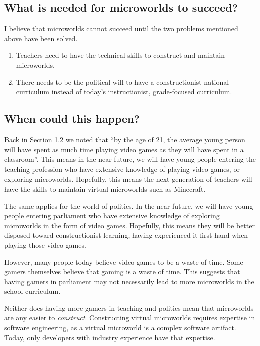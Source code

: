 \subsection{What is needed for microworlds to succeed?}

I believe that microworlds cannot succeed until the two problems
mentioned above have been solved.

\begin{enumerate}

\item
  Teachers need to have the technical skills to construct and maintain
  microworlds.

\item
  There needs to be the political will to have a constructionist
  national curriculum instead of today's instructionist, grade-focused curriculum.

\end{enumerate}

\subsection{When could this happen?}

Back in Section 1.2 we noted that ``by the age of 21, the average young
person will have spent as much time playing video games as they will
have spent in a classroom''. This means in the near future, we will have
young people entering the teaching profession who have extensive
knowledge of playing video games, or exploring microworlds. Hopefully,
this means the next generation of teachers will have the skills to
maintain virtual microworlds such as Minecraft.

The same applies for the world of politics. In the near future, we will
have young people entering parliament who have extensive knowledge of
exploring microworlds in the form of video games. Hopefully, this means
they will be better disposed toward constructionist learning, having
experienced it first-hand when playing those video games.

However, many people today believe video games to be a waste of
time\cite{debate}. Some gamers themselves believe that gaming is a waste of
time\cite{reddit:waste}. This suggests that having gamers in parliament may not
necessarily lead to more microworlds in the school curriculum.

Neither does having more gamers in teaching and politics mean that
microworlds are any easier to \emph{construct}. Constructing virtual
microworlds requires expertise in software engineering, as a virtual
microworld is a complex software artifact. Today, only developers with
industry experience have that expertise.

